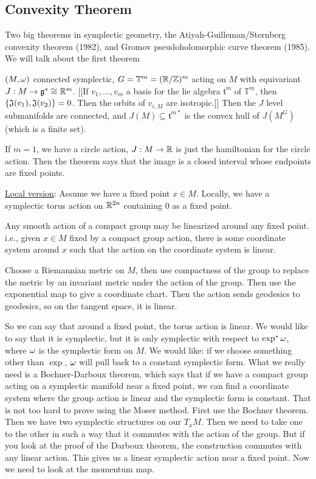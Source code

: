  \subsection*{Convexity Theorem}
 Two big theorems in symplectic geometry, the Atiyah-Guilleman/Sternberg convexity
 theorem (1982), and Gromov pseudoholomorphic curve theorem (1985).  We will talk
 about the first theorem

 \begin{theorem}
   $(M,\omega)$ connected symplectic, $G=\mathbb{T}^m=(\mathbb{R}/\mathbb{Z})^m$ acting on $M$ with equivariant
   $J:M\to \mathfrak{g}^*\cong \mathbb{R}^m$.  [[If $v_1,\dots, v_m$ a basis for the lie algebra
   $\mathfrak{t}^m$ of $\mathbb{T}^m$, then $\{\mathfrak{J}(v_1),\mathfrak{J}(v_2)\}=0$.  Then the orbits
   of $v_{i,M}$ are isotropic.]]  Then the $J$ level submanifolds are connected, and
   $J(M)\subseteq \mathfrak{t}^{m*}$ is the convex hull of $J(M^G)$ (which is a finite
   set).
 \end{theorem}
 If $m=1$, we have a circle action, $J:M\to \mathbb{R}$ is just the hamiltonian for the
 circle action.  Then the theorem says that the image is a closed interval whose
 endpoints are fixed points.

 \underline{Local version}: Assume we have a fixed point $x\in M$.  Locally, we have a
 symplectic torus action on $\mathbb{R}^{2n}$ containing $0$ as a fixed point.
 \begin{theorem}[Bachner]
   Any smooth action of a compact group may be linearized around any fixed point.
   i.e., given $x\in M$ fixed by a compact group action, there is some coordinate
   system around $x$ such that the action on the coordinate system is linear.
 \end{theorem}
 Choose a Riemannian metric on $M$, then use compactness of the group to replace the
 metric by an invariant metric under the action of the group.  Then use the
 exponential map to give a coordinate chart.  Then the action sends geodesics to
 geodesics, so on the tangent space, it is linear.

 So we can say that around a fixed point, the torus action is linear.  We would like
 to say that it is symplectic, but it is only symplectic with respect to $\exp^*\omega$,
 where $\omega$ is the symplectic form on $M$.  We would like: if we choose something
 other than $\exp$, $\omega$ will pull back to a constant symplectic form.  What we really
 need is a Bochner-Darboux theorem, which says that if we have a compact group acting
 on a symplectic manifold near a fixed point, we can find a coordinate system where
 the group action is linear and the symplectic form is constant.  That is not too hard
 to prove using the Moser method.  First use the Bochner theorem.  Then we have two
 symplectic structures on our $T_xM$.  Then we need to take one to the other in such a
 way that it commutes with the action of the group.  But if you look at the proof of
 the Darboux theorem, the construction commutes with any linear action.  This gives us
 a linear symplectic action near a fixed point.  Now we need to look at the momentum
 map.
